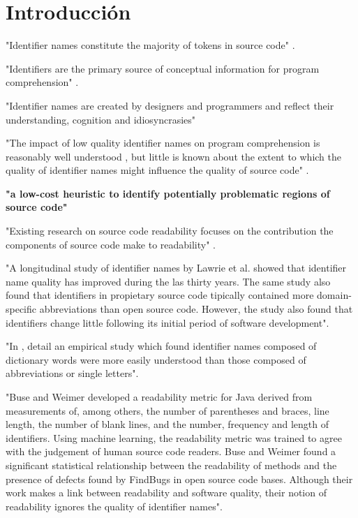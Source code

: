 \section{Introducción}

"Identifier names constitute the majority of tokens in source code" \cite{DeiBenbockPizka05}.

"Identifiers are the primary source of conceptual information for program
comprehension" \cite{RajlichWilde02}.

"Identifier names are created by designers and programmers and reflect their
understanding, cognition and idiosyncrasies" \cite{HostOstvold07}

"The impact of low quality identifier names on program comprehension is reasonably
well understood \cite{DeiBenbockPizka05,Lawrie2007,Lawrie2006}, but little is known
about the extent to which the quality of identifier names might influence the quality
of source code" \cite{ButlerWemelingerYu10}.

\textbf{"a low-cost heuristic to identify potentially problematic regions of source code"}

"Existing research on source code readability focuses on the contribution the
components of source code make to readability" \cite{Buse2008}.

"A longitudinal study of identifier names by Lawrie et al. \cite{Lawrie2007} showed that
identifier name quality has improved during the las thirty years. 
The same study also found
that identifiers in propietary source code tipically contained more domain-specific
abbreviations than open source code.
However, the study also found that identifiers change little following its initial period
of software development".

"In \cite{Lawrie2006}, detail an empirical study which found identifier names composed
of dictionary words were more easily understood than those composed of abbreviations
or single letters".

"Buse and Weimer \cite{Buse2008} developed a readability metric for Java derived from measurements 
of, among others, the number of parentheses and braces, line length, the number
of blank lines, and the number, frequency and length of identifiers.
Using machine learning, the readability metric was trained to agree with the judgement 
of human source code readers.
Buse and Weimer found a significant statistical relationship between the readability of 
methods and the presence of defects found by FindBugs in open source code bases. 
Although their work makes a link between readability and software quality, their notion
of readability ignores the quality of identifier names".

